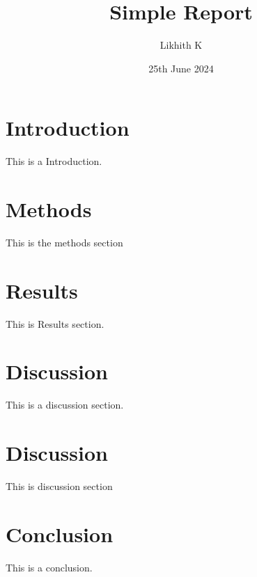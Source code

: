 \documentclass{report}
\title{Simple Report}
\author{Likhith K}
\date{25th June 2024}
\begin{document}
    \maketitle
    \tableofcontents
    \chapter{Introduction}
    This is a Introduction.
    \chapter{Methods}
    This is the methods section
    \chapter{Results}
    This is Results section.
    \chapter{Discussion}
    This is a discussion section.
    \chapter{Discussion}
    This is discussion section
    \chapter{Conclusion}
    This is a conclusion.
\end{document}
